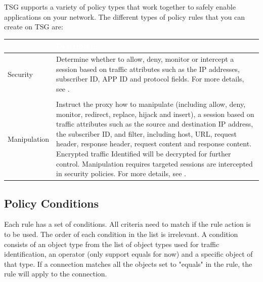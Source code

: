 TSG supports a variety of policy types that work together to safely enable applications on your network. The different types of policy rules that you can create on TSG are:\\
\begin{longtable}{p{}|p{}}   
    \rowcolor{black}\multicolumn{1}{l!{\color{white}\vrule width 0.5pt}}{\textcolor{white}{Policy Type}}  & \textcolor{white}{Description} \\\hline                                                                                                                                                          
    Security & Determine whether to allow, deny, monitor or intercept a session based on traffic attributes such as the IP addresses, subscriber ID, APP ID and protocol fields. 
    For more details, see \hyperlink{link:Security Policy}{\color{linkblue}{Security Policy}}.\\\hline                                                                                                          
    \begin{tabular}{l}\tabincell{l}{Proxy\\ Manipulation}\end{tabular} & Instruct the proxy how to manipulate (including allow, deny, monitor, redirect, replace, hijack and insert), 
    a session based on traffic attributes such as the source and destination IP address, the subscriber ID, and filter, including host, URL, 
    request header, response header, request content and response content. Encrypted traffic Identified will be decrypted for further control. 
    Manipulation requires targeted sessions are intercepted in security policies. For more details, see \hyperlink{link:Proxy Policy}{\color{linkblue}{Proxy Policy}}.\\\hline 
\end{longtable} 

\subsection*{\hypertarget{link:Policy Conditions}{Policy Conditions}}
\label{sec:policies:concepts:conditions}

Each rule has a set of conditions. All criteria need to match if the rule action is to be used. The order of each condition in the list is irrelevant. 
A condition consists of an object type from the list of object types used for traffic identification, an operator (only support equals for now) and a specific object of that type. 
If a connection matches all the objects set to "equals" in the rule, the rule will apply to the connection.


